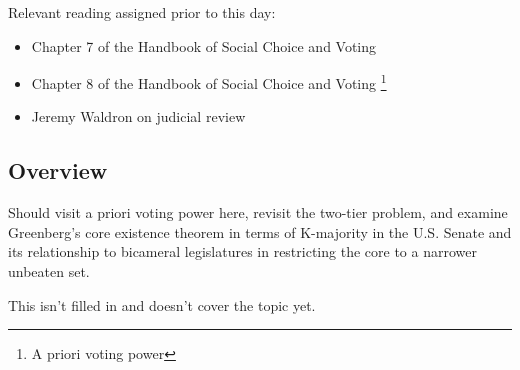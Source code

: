 Relevant reading assigned prior to this day:

\begin{itemize}
    \item Chapter 7 of the Handbook of Social Choice and Voting \autocite[102-114]{Heckelman2015}

    \item Chapter 8 of the Handbook of Social Choice and Voting \autocite[117-136]{Heckelman2015}\footnote{A priori voting power}

    \item Jeremy Waldron on judicial review \autocite{Waldron1998}

\end{itemize}

\subsection{Overview}

\begin{todo}
    Should visit a priori voting power here, revisit the two-tier problem, and examine Greenberg's core existence theorem \autocite[179-180]{Heckelman2015} in terms of K-majority in the U.S. Senate and its relationship to bicameral legislatures in restricting the core to a narrower unbeaten set.
\end{todo}

\begin{todo}
    This isn't filled in and doesn't cover the topic yet.
\end{todo}

